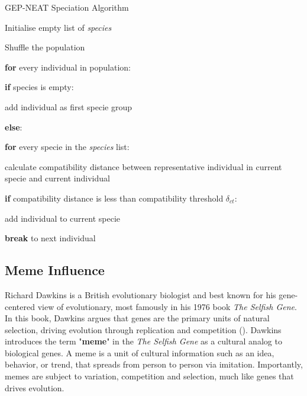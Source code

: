 \begin{algorithm}
	\caption{GEP-NEAT Speciation Algorithm}\label{alg:speciation_2}
	\begin{algorithmic}[1]
	\item Initialise empty list of \textit{species}
	\item Shuffle the population
	\item \textbf{for} every individual in population:
	\item \quad \textbf{if} species is empty:
	\item \quad \quad add individual as first specie group
	\item \quad \textbf{else}:
	\item \quad \quad \textbf{for} every specie in the \textit{species} list:
	\item \quad \quad \quad calculate compatibility distance between representative individual in current specie and current individual
	\item \quad \quad \quad \textbf{if} compatibility distance is less than compatibility threshold $\delta_{ct}$:
	\item \quad \quad \quad \quad add individual to current specie
	\item \quad \quad \quad \quad \textbf{break} to next individual
\end{algorithmic}
\end{algorithm}

\subsection{Meme Influence}
Richard Dawkins is a British evolutionary biologist and best known for his gene-centered view of evolutionary, most famously in his 1976 book \textit{The Selfish Gene}. In this book, Dawkins argues that genes are the primary units of natural selection, driving evolution through replication and competition (\cite{dawkins1981selfish}). Dawkins introduces the term "\textbf{meme}" in the \textit{The Selfish Gene} as a cultural analog to biological genes. A meme is a unit of cultural information such as an idea, behavior, or trend, that spreads from person to person via imitation. Importantly, memes are subject to variation, competition and selection, much like genes that drives evolution. \bigskip

